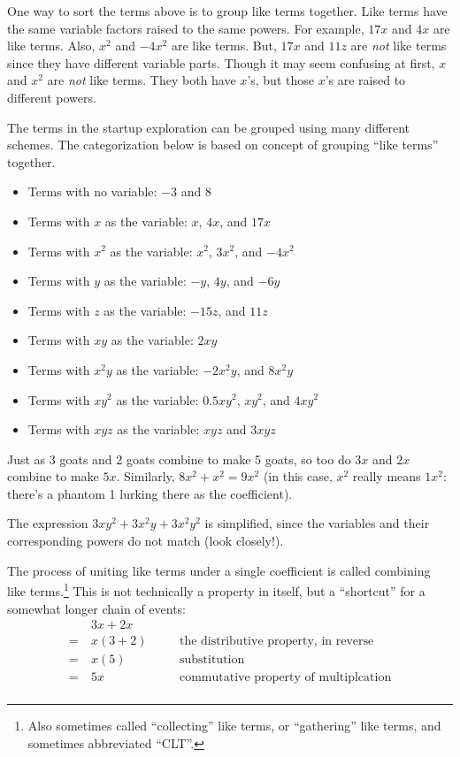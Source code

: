One way to sort the terms above is to group \gls{like terms} together. Like terms have the same variable factors raised to the same powers. For example, $17x$ and $4x$ are like terms. Also, $x^2$ and $-4x^2$ are like terms. But, $17x$ and $11z$ are \textit{not} like terms since they have different variable parts. Though it may seem confusing at first, $x$ and $x^2$ are \textit{not} like terms. They both have $x$'s, but those $x$'s are raised to different powers.

\begin{boxedex}
The terms in the startup exploration can be grouped using many different schemes. The categorization below is based on concept of grouping ``like terms'' together.
\begin{itemize}
	\item Terms with no variable: $-3$ and $8$
	\item Terms with $x$ as the variable: $x$, $4x$, and $17x$
	\item Terms with $x^2$ as the variable: $x^2$, $3x^2$, and $-4x^2$
	\item Terms with $y$ as the variable: $-y$, $4y$, and $-6y$
	\item Terms with $z$ as the variable: $-15z$, and $11z$
	\item Terms with $xy$ as the variable: $2xy$
	\item Terms with $x^2y$ as the variable: $-2x^2y$, and $8x^2y$
	\item Terms with $xy^2$ as the variable: $0.5xy^2$, $xy^2$, and $4xy^2$
	\item Terms with $xyz$ as the variable: $xyz$ and $3xyz$
\end{itemize}

\end{boxedex}

Just as 3 goats and 2 goats combine to make 5 goats, so too do $3x$ and $2x$ combine to make $5x$. Similarly, $8x^2 + x^2 = 9x^2$ (in this case, $x^2$ really means $1x^2$: there's a phantom 1 lurking there as the coefficient).

The expression $3xy^2 + 3x^2y + 3x^2y^2$ is simplified, since the variables and their corresponding powers do not match (look closely!).

The process of uniting like terms under a single coefficient is called \gls{combining like terms}.\footnote{Also sometimes called ``collecting'' like terms, or ``gathering'' like terms, and sometimes abbreviated ``CLT''.} This is not technically a property in itself, but a ``shortcut'' for a somewhat longer chain of events:
\[\begin{aligned}
	&~ 3x + 2x\\
=	&~ x(3 + 2)
&& \quad \text{the distributive property, in reverse}\\
=	&~ x(5)
&& \quad \text{substitution}\\
=	&~ 5x
&& \quad \text{commutative property of multiplcation}\\
\end{aligned}\]

